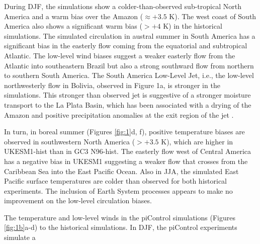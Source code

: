  During DJF, the simulations show a colder-than-observed sub-tropical North America and a warm bias over the Amazon ($\approx +3.5$ K).
 The west coast of South America also shows a significant warm bias ($>+4$ K) in the historical simulations.
 The simulated circulation in austral summer in South America has a significant bias in the easterly flow coming from the equatorial and subtropical Atlantic.
 The low-level wind biases suggest a weaker easterly flow from the Atlantic into southeastern Brazil but also a strong southward flow from northern to southern South America.
  The South America Low-Level Jet, i.e., the low-level northwesterly flow in Bolivia, observed in Figure 1a, is stronger in the simulations.
   This stronger than observed jet is suggestive of a stronger moisture transport to the La Plata Basin, which has been associated with a drying of the Amazon and positive precipitation anomalies at the exit region of the jet \citep{marengo2012,jones2017}.


In turn, in boreal summer (Figures \ref{fig:1}d, f), positive temperature biases are observed in southwestern North America ($>+3.5 $ K), which are higher in UKESM1-hist than in GC3 N96-hist.
 The easterly flow west of Central America has a negative bias in UKESM1 suggesting a weaker flow that crosses from the Caribbean Sea into the East Pacific Ocean.
 Also in JJA, the simulated East Pacific surface temperatures are colder than observed for both historical experiments.      The inclusion of Earth System processes appears to make no  improvement on the low-level circulation biases. 

The temperature and low-level winds in the piControl simulations (Figures \ref{fig:1b}a-d)  to the historical simulations.
 In DJF, the piControl experiments simulate a 
 
